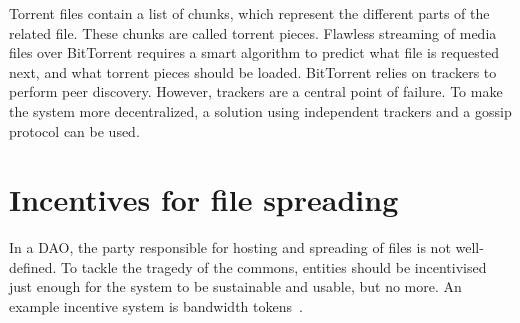 Torrent files contain a list of chunks, which represent the different parts of the related file. These chunks are called torrent pieces. Flawless streaming of media files over BitTorrent requires a smart algorithm to predict what file is requested next, and what torrent pieces should be loaded. BitTorrent relies on trackers to perform peer discovery. However, trackers are a central point of failure. To make the system more decentralized, a solution using independent trackers and a gossip protocol\cite{dan2011efficient} can be used. 

\section{Incentives for file spreading}
In a DAO, the party responsible for hosting and spreading of files is not well-defined. To tackle the tragedy of the commons, entities should be incentivised just enough for the system to be sustainable and usable, but no more. An example incentive system is bandwidth tokens~\citep{de2018blockchain}.

